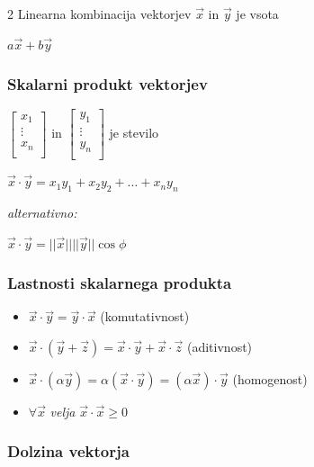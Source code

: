 \documentclass{article}
\begin{document}
\begin{multicols}{2}
	Linearna kombinacija vektorjev $\vec{x}$ in $\vec{y}$ je vsota
	\begin{center}
		$a\vec{x} + b\vec{y}$
	\end{center}

	\subsubsection{Skalarni produkt vektorjev}


	\begin{center}
		$\begin{bmatrix}
				x_{1}  \\
				\vdots \\
				x_{n}  \\
			\end{bmatrix}$ in
		$\begin{bmatrix}
				y_{1}  \\
				\vdots \\
				y_{n}  \\
			\end{bmatrix}$ je stevilo
	\end{center}
	\begin{center}
		$\vec{x} \cdot \vec{y} = x_{1}y_{1} + x_{2}y_{2} + \dots + x_{n}y_{n}$
	\end{center} \textit{alternativno:}
	\begin{center}
		$\vec{x} \cdot \vec{y} = ||\vec{x}|| ||\vec{y}|| \cos \phi$
	\end{center}

	\subsubsection{Lastnosti skalarnega produkta}

	\begin{itemize}
		\item $\vec{x} \cdot \vec{y} = \vec{y} \cdot \vec{x}$ (komutativnost)
		\item $\vec{x} \cdot (\vec{y} + \vec{z}) = \vec{x} \cdot \vec{y} + \vec{x} \cdot \vec{z}$ (aditivnost)
		\item $\vec{x} \cdot (\alpha \vec{y}) = \alpha(\vec{x} \cdot \vec{y}) = (\alpha \vec{x}) \cdot \vec{y}$ (homogenost)
		\item $\forall \vec{x}$ \textit{velja} $\vec{x} \cdot \vec{x} \geq 0$
	\end{itemize}

	\subsubsection{Dolzina vektorja}


\end{multicols}
\end{document}
